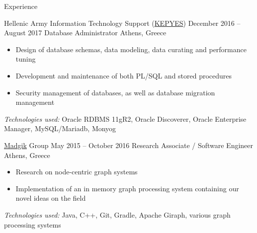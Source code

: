 \documentclass{resume}
\begin{document}
\newcommand{\mytilde}{\raise.17ex\hbox{$\scriptstyle\mathtt{\sim}$}}
\newcommand{\indentitem}{\setlength\itemindent{25pt}}



\begin{rSection}{Experience}

\begin{rSubsection}
  {Hellenic Army Information Technology Support  (\href{http://www.army.gr/default.php?pname=kepyes}{KEPYES})}
  {December 2016 -- August 2017}
  {Database Administrator}
  {Athens, Greece}
    \begin{itemize}
   \item Design of database schemas, data modeling, data curating and performance tuning
   \item Development and maintenance of both PL/SQL and stored procedures
   \item Security management of databases, as well as database migration management

    \end{itemize}
   \textit{Technologies used:} Oracle RDBMS 11gR2, Oracle Discoverer, Oracle Enterprise Manager, MySQL/Mariadb, Monyog
 
\end{rSubsection}

\begin{rSubsection}
  {\href{http://www.madgik.di.uoa.gr/}{Madgik} Group}
  {May 2015 -- October 2016}
  {Research Associate / Software Engineer}
  {Athens, Greece}
    \begin{itemize}
   \item Research on node-centric graph systems
   \item Implementation of an in memory graph processing system containing our novel ideas on the field
    \end{itemize}
    
   \textit{Technologies used:} Java, C++, Git, Gradle, Apache Giraph, various graph processing systems

   
\end{rSubsection}



\end{rSection}
\end{document}
